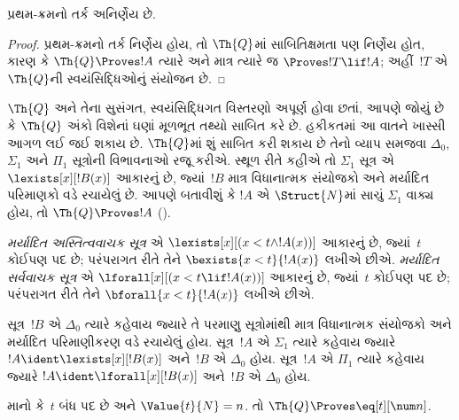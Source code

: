 \begin{cor}
પ્રથમ-ક્રમનો તર્ક અનિર્ણેય છે.
\end{cor}

\begin{proof}
પ્રથમ-ક્રમનો તર્ક નિર્ણેય
હોય, તો $\Th{Q}$માં
સાબિતિક્ષમતા પણ નિર્ણેય
હોત, કારણ કે
$\Th{Q} \Proves !A$ ત્યારે અને
માત્ર ત્યારે જ
$\Proves !T \lif !A$;
અહીં~$!T$ એ $\Th{Q}$ની
સ્વયંસિદ્ધિઓનું સંયોજન છે.
\end{proof}
\endgroup


\begingroup
\makeatletter{}\makeatother

\label{guunit:OLP-0300}


$\Th{Q}$ અને તેના સુસંગત,
સ્વયંસિદ્ધિગત વિસ્તરણો અપૂર્ણ
હોવા છતાં, આપણે જોયું છે કે
$\Th{Q}$ અંકો વિશેનાં ઘણાં
મૂળભૂત તથ્યો સાબિત કરે છે.
હકીકતમાં આ વાતને ખાસ્સી
આગળ લઈ જઈ શકાય છે.
$\Th{Q}$માં શું સાબિત કરી
શકાય છે તેનો વ્યાપ સમજવા
$\Delta_0$, $\Sigma_1$ અને
$\Pi_1$ સૂત્રોની
વિભાવનાઓ રજૂ કરીએ.
સ્થૂળ રીતે કહીએ તો
$\Sigma_1$ સૂત્ર એ
$\lexists[x][!B(x)]$ આકારનું
છે, જ્યાં~$!B$ માત્ર વિધાનાત્મક
સંયોજકો અને મર્યાદિત પરિમાણકો
વડે રચાયેલું છે. આપણે બતાવીશું
કે $!A$ એ $\Struct{N}$માં
સાચું $\Sigma_1$ વાક્ય
હોય, તો $\Th{Q} \Proves !A$
().

\begin{defn}
\emph{મર્યાદિત અસ્તિત્વવાચક
સૂત્ર} એ
$\lexists[x][(x < t \land !A(x))]$
આકારનું છે, જ્યાં~$t$ કોઈપણ
પદ છે; પરંપરાગત રીતે તેને
$\bexists{x < t}{!A(x)}$
લખીએ છીએ.
\emph{મર્યાદિત સર્વવાચક
સૂત્ર} એ
$\lforall[x][(x < t \lif !A(x))]$
આકારનું છે, જ્યાં~$t$ કોઈપણ
પદ છે; પરંપરાગત રીતે તેને
$\bforall{x < t}{!A(x)}$
લખીએ છીએ.
\end{defn}

\begin{defn}
સૂત્ર~$!B$ એ $\Delta_0$
ત્યારે કહેવાય જ્યારે તે
પરમાણુ સૂત્રોમાંથી
માત્ર વિધાનાત્મક સંયોજકો
અને મર્યાદિત પરિમાણીકરણ
વડે રચાયેલું હોય.
સૂત્ર~$!A$ એ $\Sigma_1$
ત્યારે કહેવાય જ્યારે
$!A \ident \lexists[x][!B(x)]$
અને~$!B$ એ $\Delta_0$ હોય.
સૂત્ર~$!A$ એ $\Pi_1$
ત્યારે કહેવાય જ્યારે
$!A \ident \lforall[x][!B(x)]$
અને~$!B$ એ $\Delta_0$ હોય.
\end{defn}

\begin{lem}
માનો કે~$t$ બંધ પદ છે અને
$\Value{t}{N} = n$. તો
$\Th{Q} \Proves \eq[t][\num n]$.
\end{lem}

